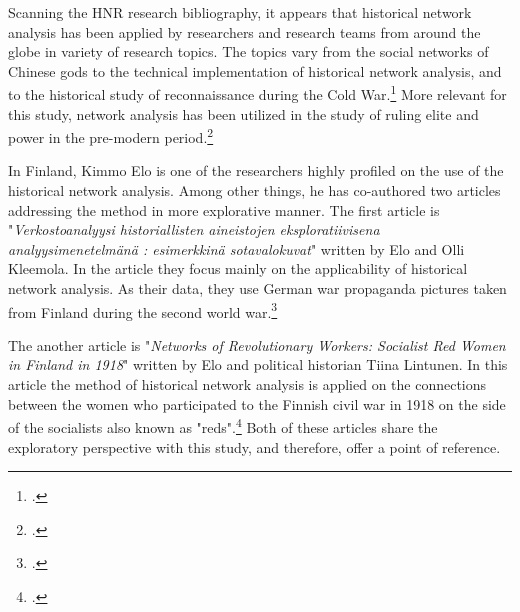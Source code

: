 \documentclass[a4paper,12pt]{article}
\begin{document}
\begin{onehalfspace}
Scanning the HNR research bibliography, it appears that historical network analysis has been applied by researchers and research teams from around the globe in variety of research topics. The topics vary from the social networks of Chinese gods to the technical implementation of historical network analysis, and to the historical study of reconnaissance during the Cold War.\footcites[p. 22.]{elo16}{hnrbib} More relevant for this study, network analysis has been utilized in the study of ruling elite and power in the pre-modern period.\footcite[See e. g. Ruth Ahnert's and Sebastian E. Ahnert's book \textit{Tudor Networks of Power} (2023) or Paul D Mclean's article \textit{Widening Access While Tightening Control: Office-Holding, Marriages, and Elite Consolidation in Early Modern Poland} (2004).]{JonVidarEt} 
 
In Finland, Kimmo Elo is one of the researchers highly profiled on the use of the historical network analysis. Among other things, he has co-authored two articles addressing the method in more explorative manner. The first article is "\textit{Verkostoanalyysi historiallisten aineistojen eksploratiivisena analyysimenetelmänä : esimerkkinä sotavalokuvat}" written by Elo and Olli Kleemola. In the article they focus mainly on the applicability of historical network analysis. As their data, they use German war propaganda pictures taken from Finland during the second world war.\footcite{eloAklee15}

The another article is "\textit{Networks of Revolutionary Workers: Socialist Red Women in Finland in 1918}" written by Elo and political historian Tiina Lintunen. In this article the method of historical network analysis is applied on the connections between the women who participated to the Finnish civil war in 1918 on the side of the socialists also known as "reds".\footcite[Almost the same article is found in Finnish in the \textit{Historiallinen Aikakauskirja} 116 (2/2018).]{LintunenAndElo2019} Both of these articles share the exploratory perspective with this study, and therefore, offer a point of reference. 


\end{onehalfspace}
\end{document}
